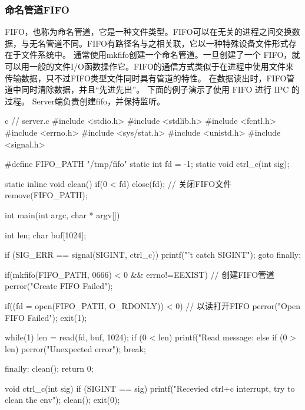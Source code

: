 \subsubsection{命名管道FIFO}
FIFO，也称为命名管道，它是一种文件类型。FIFO可以在无关的进程之间交换数据，与无名管道不同。FIFO有路径名与之相关联，它以一种特殊设备文件形式存在于文件系统中。
通常使用mkfifo创建一个命名管道。一旦创建了一个 FIFO，就可以用一般的文件I/O函数操作它。FIFO的通信方式类似于在进程中使用文件来传输数据，只不过FIFO类型文件同时具有管道的特性。
在数据读出时，FIFO管道中同时清除数据，并且“先进先出”。
下面的例子演示了使用 FIFO 进行 IPC 的过程。
Server端负责创建fifo，并保持监听。
\begin{code-block}{c}
// server.c
#include <stdio.h>
#include <stdlib.h>
#include <fcntl.h>
#include <errno.h>
#include <sys/stat.h>
#include <unistd.h>
#include <signal.h>

#define FIFO_PATH "/tmp/fifo"
static int fd = -1;
static void ctrl_c(int sig);

static inline void clean()
{
        if(0 < fd)
        {
                close(fd);  // 关闭FIFO文件
        }
        remove(FIFO_PATH);
}

int main(int argc, char * argv[])
{
        int len;
        char buf[1024];

        if (SIG_ERR == signal(SIGINT, ctrl_c))
        {
                printf("\ncan't catch SIGINT\n");
                goto finally;
        }

        if(mkfifo(FIFO_PATH, 0666) < 0 && errno!=EEXIST) // 创建FIFO管道
                perror("Create FIFO Failed");

        if((fd = open(FIFO_PATH, O_RDONLY)) < 0)  // 以读打开FIFO
        {
                perror("Open FIFO Failed");
                exit(1);
        }

        while(1)
        {
                len = read(fd, buf, 1024);
                if (0 < len)
                {
                        printf("Read message: %
                }
                else if (0 > len)
                {
                        perror("Unexpected error\n");
                        break;
                }
        }

finally:
        clean();
        return 0;
}

void ctrl_c(int sig)
{
        if (SIGINT == sig)
        {
                printf("Recevied ctrl+c interrupt, try to clean the env\n");
                clean();
                exit(0);
        }
}
\end{code-block}

